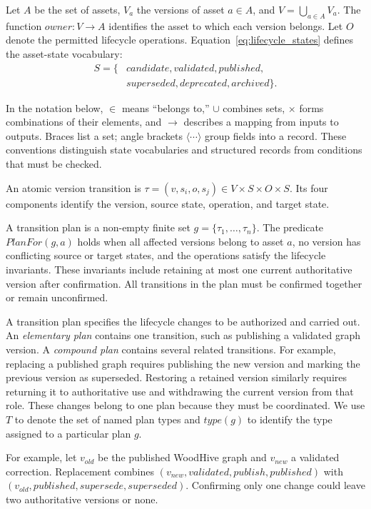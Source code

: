 \documentclass[journal]{IEEEtran}
\begin{document}
Let $A$ be the set of assets, $V_a$ the versions of asset
$a\in A$, and $V=\bigcup_{a\in A}V_a$.
The function $owner:V\rightarrow A$ identifies the asset to
which each version belongs. Let $O$ denote the permitted
lifecycle operations. Equation~\ref{eq:lifecycle_states}
defines the asset-state vocabulary:
\begin{equation}
\label{eq:lifecycle_states}
\begin{aligned}
S=\{&\mathit{candidate},\mathit{validated},\mathit{published},\\
&\mathit{superseded},\mathit{deprecated},\mathit{archived}\}.
\end{aligned}
\end{equation}

In the notation below, $\in$ means ``belongs to,'' $\cup$
combines sets, $\times$ forms combinations of their elements,
and $\rightarrow$ describes a mapping from inputs to outputs.
Braces list a set; angle brackets $\langle\cdots\rangle$ group fields into a record.
These conventions distinguish state vocabularies and structured
records from conditions that must be checked.

An atomic version transition is
$\tau=(v,s_i,o,s_j)\in V\times S\times O\times S$.
Its four components identify the version, source state,
operation, and target state.

A transition plan is a non-empty finite set
$g=\{\tau_1,\ldots,\tau_n\}$.
The predicate $PlanFor(g,a)$ holds when all affected versions
belong to asset $a$, no version has conflicting source or
target states, and the operations satisfy the lifecycle
invariants. These invariants include retaining at most one
current authoritative version after confirmation.
All transitions in the plan must be confirmed together
or remain unconfirmed.

A transition plan specifies the lifecycle changes to be
authorized and carried out. An \emph{elementary plan} contains
one transition, such as publishing a validated graph version.
A \emph{compound plan} contains several related transitions.
For example, replacing a published graph requires publishing
the new version and marking the previous version as
superseded. Restoring a retained version similarly requires
returning it to authoritative use and withdrawing the current
version from that role. These changes belong to one plan
because they must be coordinated.
We use $T$ to denote the set of named plan types and
$type(g)$ to identify the type assigned to a particular
plan $g$.

For example, let $v_{old}$ be the published WoodHive graph
and $v_{new}$ a validated correction. Replacement combines
$(v_{new},\mathit{validated},\mathit{publish},\mathit{published})$
with
$(v_{old},\mathit{published},\mathit{supersede},\mathit{superseded})$.
Confirming only one change could leave two authoritative
versions or none.
\end{document}
